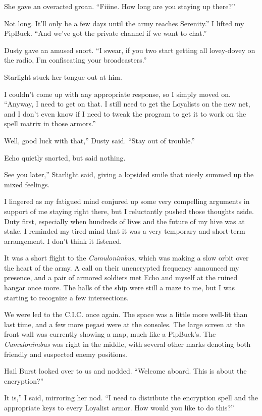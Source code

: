 She gave an overacted groan. “Fiiine. How long are you staying up there?”

\leavevmode{}Not long. It’ll only be a few days until the army reaches Serenity.” I lifted my PipBuck. “And we’ve got the private channel if we want to chat.”

Dusty gave an amused snort. “I swear, if you two start getting all lovey-dovey on the radio, I’m confiscating your broadcasters.”

Starlight stuck her tongue out at him.

I couldn’t come up with any appropriate response, so I simply moved on. “Anyway, I need to get on that. I still need to get the Loyalists on the new net, and I don’t even know if I need to tweak the program to get it to work on the spell matrix in those armors.”

\leavevmode{}Well, good luck with that,” Dusty said. “Stay out of trouble.”

Echo quietly snorted, but said nothing.

\leavevmode{}See you later,” Starlight said, giving a lopsided smile that nicely summed up the mixed feelings.

I lingered as my fatigued mind conjured up some very compelling arguments in support of me staying right there, but I reluctantly pushed those thoughts aside. Duty first, especially when hundreds of lives and the future of my hive was at stake. I reminded my tired mind that it was a very temporary and short-term arrangement. I don’t think it listened.

It was a short flight to the \textit{Cumulonimbus}, which was making a slow orbit over the heart of the army. A call on their unencrypted frequency announced my presence, and a pair of armored soldiers met Echo and myself at the ruined hangar once more. The halls of the ship were still a maze to me, but I was starting to recognize a few intersections.

We were led to the C.I.C. once again. The space was a little more well-lit than last time, and a few more pegasi were at the consoles. The large screen at the front wall was currently showing a map, much like a PipBuck’s. The \textit{Cumulonimbus} was right in the middle, with several other marks denoting both friendly and suspected enemy positions.

Hail Burst looked over to us and nodded. “Welcome aboard. This is about the encryption?”

\leavevmode{}It is,” I said, mirroring her nod. “I need to distribute the encryption spell and the appropriate keys to every Loyalist armor. How would you like to do this?”


